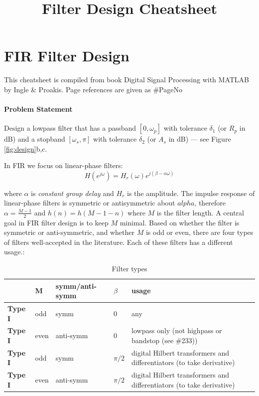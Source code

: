 \documentclass{article}
\begin{document}
\title{\bf Filter Design Cheatsheet}
\maketitle

\section{FIR Filter Design}
This cheatsheet is compiled from book Digital Signal Processing with MATLAB by Ingle \& Proakis. Page references are given as \#PageNo

\paragraph{Problem Statement}
Design a lowpass filter that has a passband $[0,\omega_p]$ with tolerance $\delta_1$ (or $R_p$ in dB) and a stopband $[\omega_s, \pi]$ with tolerance $\delta_2$ (or $A_s$ in dB) \---- see Figure \ref{fig:design}b,c.

In FIR we focus on linear-phase filters:
\begin{equation}
H(e^{j\omega})=H_r(\omega)e^{j(\beta-\alpha\omega)}
\end{equation}

where $\alpha$ is \textit{constant group delay} and $H_r$ is the amplitude. The impulse response of linear-phase filters is symmetric or antisymmetric about $alpha$, therefore $\alpha=\frac{M-1}{2}$ and $h(n)=h(M-1-n)$ where $M$ is the filter length. A central goal in FIR filter design is to keep $M$ minimal. Based on whether the filter is symmetric or anti-symmetric, and whether $M$ is odd or even, there are four types of filters well-accepted in the literature. Each of these filters has a different usage.:

\begin{table}[h]
\centering
\begin{tabular}{|l|l|l|l|l|} \hline
 & M & symm/anti-symm  & $\beta$ & usage \\ \hline
\textbf{Type I} & odd & symm & 0 & any\\
\textbf{Type I} & even & anti-symm & 0 & lowpass only (not highpass or bandstop (see \#233)) \\
\textbf{Type I} & odd & symm & $\pi/2$ & digital Hilbert transformers and differentiators (to take derivative)\\
\textbf{Type I} & even & anti-symm & $\pi/2$ & digital Hilbert transformers and differentiators (to take derivative)\\ \hline
\end{tabular}
\caption{Filter types}
\label{tab:types}
\end{table}
\end{document}
